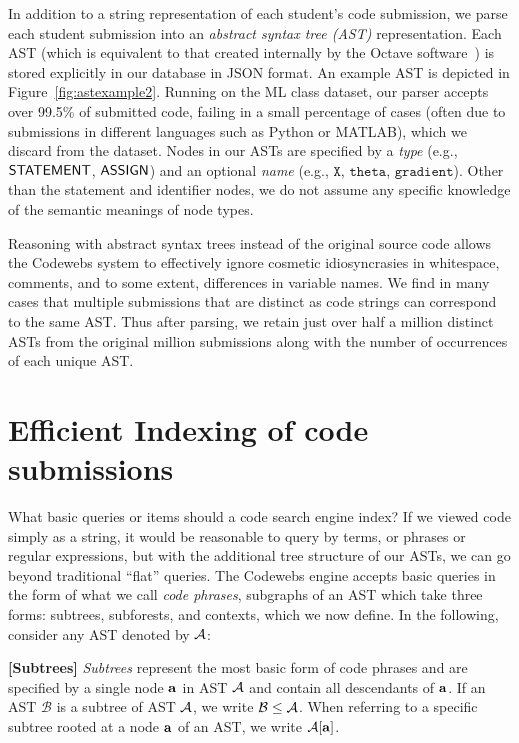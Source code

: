 	
 In addition to a string representation of each student's code submission,
we parse each student submission into an \emph{abstract syntax tree (AST)} representation. 
Each AST (which is equivalent to that created internally by the Octave software~\cite{eaton97}) 
is stored explicitly in our database in JSON format.   An example AST is depicted in Figure~\ref{fig:astexample2}.
Running on the ML class dataset, our parser accepts over 99.5\% of  submitted code, failing in 
a small percentage of cases (often due to submissions in different languages such as Python or MATLAB),
which we discard from the dataset.  
Nodes in our ASTs are specified by a \emph{type} (e.g., ${\mathsf{STATEMENT}}$, ${\mathsf{ASSIGN}}$) and an optional \emph{name} (e.g., $\texttt{X}$, $\texttt{theta}$, 
$\texttt{gradient}$). 
Other than the statement and identifier nodes, we do not assume any specific knowledge of the semantic meanings of node types.

 Reasoning with abstract syntax trees instead of the original source code allows the Codewebs system to effectively ignore
cosmetic idiosyncrasies in whitespace, comments, and to some extent, differences in variable 
names.   We find in many cases that multiple submissions that are distinct as code strings can correspond to the same AST.
Thus after parsing, we retain just over half a million distinct ASTs from the original million submissions along with the number
of occurrences of each unique AST.  

\section{Efficient Indexing of code submissions}\label{sec:indexing}
 What basic queries or items should a code search engine index?
If we viewed code simply as a string, it would be reasonable to query by terms, or phrases or regular expressions,
but with the additional tree structure of our ASTs, we can go beyond traditional ``flat'' queries.
The Codewebs engine accepts basic queries in the form of what we call \emph{code phrases}, subgraphs of an AST
which take three forms: subtrees, subforests, and contexts, which we now define.  In the following, consider any AST denoted by $\mathcal{A}$:

{{\noindent \bf [Subtrees]}} \emph{Subtrees} represent the most basic form of code phrases and 
are specified by a single node ${\bf a}$ in AST $\mathcal{A}$ and contain all descendants of ${\bf a}$.
If an AST $\mathcal{B}$ is a subtree of AST $\mathcal{A}$, we write $\mathcal{B} \leq \mathcal{A}$.
When referring to a specific subtree rooted at a node ${\bf a}$ of an AST, we write $\mathcal{A}[{\bf a}]$.

